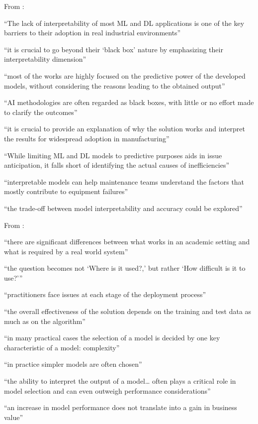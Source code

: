 From \parencite{presciuttini2024ml_iot_manufacturing_operations} :

“The lack of interpretability of most ML and DL applications is one of the key barriers to their adoption in real industrial environments”

“it is crucial to go beyond their ‘black box’ nature by emphasizing their interpretability dimension”

“most of the works are highly focused on the predictive power of the developed models, without considering the reasons leading to the obtained output”

“AI methodologies are often regarded as black boxes, with little or no effort made to clarify the outcomes”

“it is crucial to provide an explanation of why the solution works and interpret the results for widespread adoption in manufacturing”

“While limiting ML and DL models to predictive purposes aids in issue anticipation, it falls short of identifying the actual causes of inefficiencies”

“interpretable models can help maintenance teams understand the factors that mostly contribute to equipment failures”

“the trade-off between model interpretability and accuracy could be explored”

From \parencite{paleyes2022challenges_deploying_ml_survey_case_studies} :

“there are significant differences between what works in an academic setting and what is required by a real world system”

“the question becomes not ‘Where is it used?,’ but rather ‘How difficult is it to use?’”

“practitioners face issues at each stage of the deployment process”

“the overall effectiveness of the solution depends on the training and test data as much as on the algorithm”

“in many practical cases the selection of a model is decided by one key characteristic of a model: complexity”

“in practice simpler models are often chosen”

“the ability to interpret the output of a model… often plays a critical role in model selection and can even outweigh performance considerations”

“an increase in model performance does not translate into a gain in business value”

